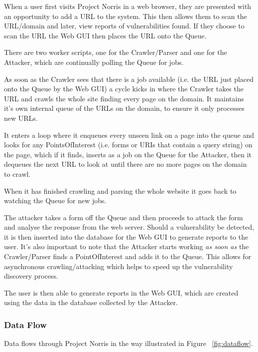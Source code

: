 \documentclass[12pt,a4paper]{article}
\begin{document}

When a user first visits Project Norris in a web browser, they are presented with an opportunity to add a URL to the system.  This then allows them to scan the URL/domain and later, view reports of vulnerabilities found.  If they choose to scan the URL the Web GUI then places the URL onto the Queue.

There are two worker scripts, one for the Crawler/Parser and one for the Attacker, which are continually polling the Queue for jobs.

As soon as the Crawler sees that there is a job available (i.e. the URL just placed onto the Queue by the Web GUI) a cycle kicks in where the Crawler takes the URL and crawls the whole site finding every page on the domain.  It maintains it’s own internal queue of the URLs on the domain, to ensure it only processes new URLs.

It enters a loop where it enqueues every unseen link on a page into the queue and looks for any PointsOfInterest (i.e. forms or URIs that contain a query string) on the page, which if it finds, inserts as a job on the Queue for the Attacker, then it dequeues the next URL to look at until there are no more pages on the domain to crawl.

When it has finished crawling and parsing the whole website it goes back to watching the Queue for new jobs.

The attacker takes a form off the Queue and then proceeds to attack the form and analyse the response from the web server.  Should a vulnerability be detected, it is then inserted into the database for the Web GUI to generate reports to the user.  It's also important to note that the Attacker starts working \emph{as soon as} the Crawler/Parser finds a PointOfInterest and adds it to the Queue.  This allows for asynchronous crawling/attacking which helps to speed up the vulnerability discovery process.

The user is then able to generate reports in the Web GUI, which are created using the data in the database collected by the Attacker.

\subsubsection{Data Flow}
Data flows through Project Norris in the way illustrated in Figure ~\ref{fig:dataflow}.
\end{document}

